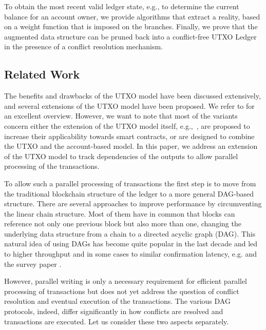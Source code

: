 \documentclass[11pt]{article}
\theoremstyle{plain}
\theoremstyle{definition}
\numberwithin{definition}{section}
\numberwithin{lemma}{section}
\numberwithin{ass}{section}
\numberwithin{remark}{section}
\numberwithin{example}{section}
\numberwithin{proposition}{section}
\numberwithin{theorem}{section}
\begin{document}
To obtain the most recent valid ledger state, e.g., to determine the current balance for an account owner, we provide algorithms that extract a reality, based on a weight function that is imposed on the branches. 
Finally, we prove that the augmented data structure can be pruned back into a conflict-free UTXO Ledger in the presence of a conflict resolution mechanism.

\subsection{Related Work}

The benefits and drawbacks of the UTXO model have been discussed extensively, and several extensions of the UTXO model have been proposed. We refer to \cite{vademecum} for an excellent overview. However, we want to note that most of the variants concern either the extension of the UTXO model itself, e.g.,~\cite{cardanoEUTXO}, are proposed to increase their applicability towards smart contracts, or are designed to combine the UTXO and the account-based  model. 
In this paper, we address an extension of the UTXO model to track dependencies of the outputs to allow parallel processing of the transactions.

To allow such a parallel processing of transactions the first step is to move from the traditional blockchain structure of the ledger to a more general DAG-based structure. There are several approaches to improve performance by circumventing the linear chain structure.  Most of them have in common that blocks can reference not only one previous block but also more than one, changing the underlying data structure from a chain to a directed acyclic graph (DAG). This natural idea of using DAGs has become quite popular in the last decade and led to higher throughput and in some cases to similar confirmation latency,
e.g. \cite{Sompolinsky2013AcceleratingBT, NXT,DagCoin, lewenberg2015inclusive,popov2015, SPECTRE, PHANTOM, Prism, Gagol2019, Li2020GHASTBC, OHIE, Narwhal22, Bullshark, CordialMiners, DAGKNIGHT} and the survey paper \cite{Wang2020SoKDI}.


However, parallel writing is only a necessary requirement for efficient parallel processing of transactions but does not yet address the question of  conflict resolution and eventual execution of the transactions. The various DAG protocols, indeed, differ significantly in how conflicts are resolved and transactions are executed. Let us consider these two aspects separately.
\end{document}
